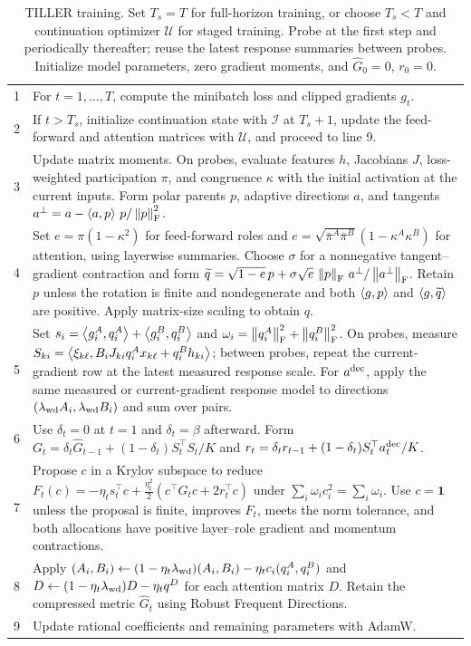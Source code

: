 \begin{table}[!htbp]
\caption{TILLER training. Set $T_s=T$ for full-horizon training,
or choose $T_s<T$ and continuation optimizer $\mathcal U$ for staged
training. Probe at the first step and periodically thereafter;
reuse the latest response summaries between probes.
Initialize model parameters, zero gradient moments, and
$\widehat G_0=0$, $r_0=0$.}
\label{tab:algorithm}
\label{app:algorithm}
\centering
\small
\begin{tabularx}{\linewidth}{@{}r >{\raggedright\arraybackslash}X@{}}
\toprule
1 & For $t=1,\ldots,T$, compute the minibatch loss and clipped gradients $g_t$.\\
2 & If $t>T_s$, initialize continuation state with $\mathcal I$ at
$T_s+1$, update the feed-forward and attention matrices with
$\mathcal U$, and proceed to line 9.\\
3 & Update matrix moments. On probes, evaluate features $h$, Jacobians $J$,
loss-weighted participation $\pi$, and congruence $\kappa$ with the
initial activation at the current inputs. Form polar parents $p$,
adaptive directions $a$, and tangents $a^\perp=a-\left\langle a,p\right\rangle\,p/\left\lVert p\right\rVert_{\mathrm F}^2$.\\
4 & Set $e=\pi(1-\kappa^2)$ for feed-forward roles and
$e=\sqrt{\bar\pi^A\bar\pi^B}(1-\kappa^A\kappa^B)$ for attention,
using layerwise summaries. Choose $\sigma$ for a nonnegative tangent--gradient contraction
and form $\widetilde q=\sqrt{1-e}\,p+
\sigma\sqrt e\,\left\lVert p\right\rVert_{\mathrm F}\,a^\perp/\left\lVert a^\perp\right\rVert_{\mathrm F}$.
Retain $p$ unless the rotation is finite and nondegenerate and both
$\left\langle g,p\right\rangle$ and $\left\langle g,\widetilde q\right\rangle$ are positive.
Apply matrix-size scaling to obtain $q$.\\
5 & Set $s_i=\left\langle g_i^A,q_i^A\right\rangle+\left\langle g_i^B,q_i^B\right\rangle$ and
$\omega_i=\left\lVert q_i^A\right\rVert_{\mathrm F}^2+\left\lVert q_i^B\right\rVert_{\mathrm F}^2$.
On probes, measure $S_{ki}=\left\langle \xi_{k\ell},B_iJ_{ki}q_i^Ax_{k\ell}+q_i^Bh_{ki}\right\rangle$;
between probes, repeat the current-gradient row at the latest measured
response scale. For $a^{\rm dec}$, apply the same measured or
current-gradient response model to directions
$(\lambda_{\rm wd}A_i,\lambda_{\rm wd}B_i)$ and sum over pairs.\\
6 & Use $\delta_t=0$ at $t=1$ and $\delta_t=\beta$ afterward. Form
$G_t=\delta_t\widehat G_{t-1}+(1-\delta_t)S_t^\top S_t/K$ and
$r_t=\delta_tr_{t-1}+(1-\delta_t)S_t^\top a_t^{\rm dec}/K$.\\
7 & Propose $c$ in a Krylov subspace to reduce
$F_t(c)=-\eta_ts_t^\top c+\frac{\eta_t^2}{2}(c^\top G_tc+2r_t^\top c)$
under $\sum_i\omega_ic_i^2=\sum_i\omega_i$.
Use $c=\boldsymbol1$ unless the proposal is finite, improves $F_t$,
meets the norm tolerance, and both allocations have positive
layer--role gradient and momentum contractions.\\
8 & Apply $(A_i,B_i)\leftarrow(1-\eta_t\lambda_{\rm wd})(A_i,B_i)
-\eta_tc_i(q_i^A,q_i^B)$ and
$D\leftarrow(1-\eta_t\lambda_{\rm wd})D-\eta_tq^D$ for each attention matrix $D$.
Retain the compressed metric $\widehat G_t$ using Robust Frequent Directions.\\
9 & Update rational coefficients and remaining parameters with AdamW.\\
\bottomrule
\end{tabularx}
\end{table}

